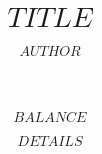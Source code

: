 \documentclass[a4paper,12pt]{article}
\title{$$TITLE$$}
\author{$$AUTHOR$$}
\date{}
\begin{document}
\footnotesize
{}
\onehalfspacing
\maketitle
{}

$$BALANCE$$

$$DETAILS$$
\end{document}
